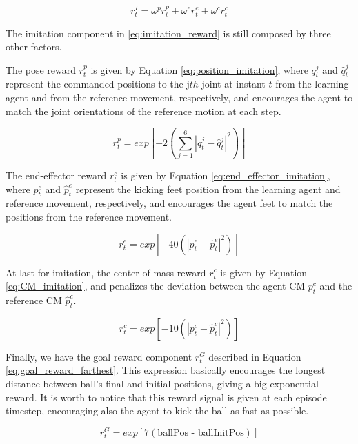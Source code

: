 \begin{equation}
r^I_t = \omega^p r^p_t + \omega^e r^e_t + \omega^c r^c_t
\label{eq:imitation_reward}
\end{equation}

The imitation component in \eqref{eq:imitation_reward} is still composed by three other factors.

The pose reward $r^p_t$ is given by Equation \eqref{eq:position_imitation}, where $q_t^j$ and $\hat{q}_t^j$ represent the commanded positions to the j$th$ joint at instant $t$ from the learning agent and from the reference movement, respectively, and encourages the agent to match the joint orientations of the reference motion at each step.

\begin{equation}
r^p_t = exp \left[ -2 \left( \sum_{j=1}^{6}{|q_t^j-\hat{q}_t^j|^2} \right) \right]
\label{eq:position_imitation}
\end{equation}

The end-effector reward $r_t^e$ is given by Equation \eqref{eq:end_effector_imitation}, where $p_t^e$ and $\hat{p}_t^e$ represent the kicking feet position from the learning agent and reference movement, respectively, and encourages the agent feet to match the positions from the reference movement.

\begin{equation}
r^e_t = exp \left[ -40 \left( |p_t^e-\hat{p}_t^e|^2 \right) \right]
\label{eq:end_effector_imitation}
\end{equation}

At last for imitation, the center-of-mass reward $r_t^c$ is given by Equation \eqref{eq:CM_imitation}, and penalizes the deviation between the agent CM $p_t^c$ and the reference CM $\hat{p}_t^c$.

\begin{equation}
r^c_t = exp \left[ -10 \left( |p_t^c-\hat{p}_t^c|^2 \right) \right]
\label{eq:CM_imitation}
\end{equation}

Finally, we have the goal reward component $r_t^G$ described in Equation \eqref{eq:goal_reward_farthest}. This expression basically encourages the longest distance between ball's final and initial positions, giving a big exponential reward. It is worth to notice that this reward signal is given at each episode timestep, encouraging also the agent to kick the ball as fast as possible.

\begin{equation}
r_t^G = exp \left[ 7 (\text{ballPos - ballInitPos}) \right]
\label{eq:goal_reward_farthest}
\end{equation}

